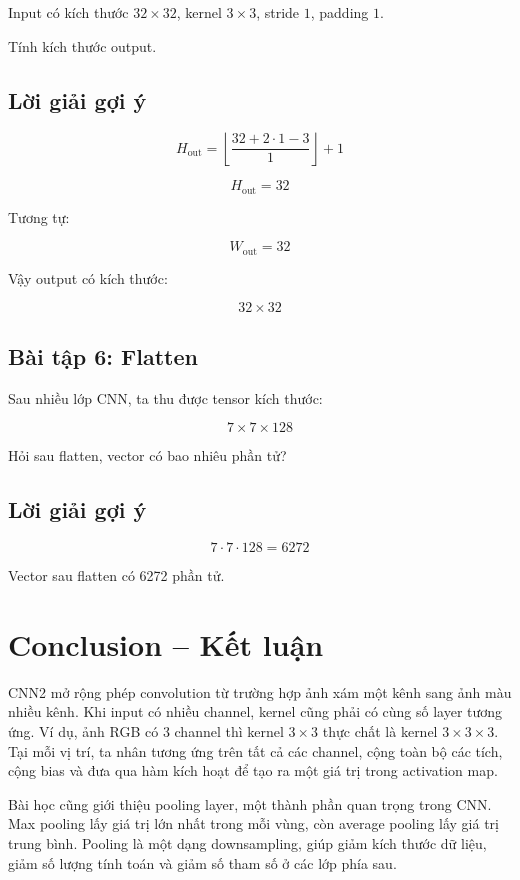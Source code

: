 Input có kích thước $32\times32$, kernel $3\times3$, stride $1$, padding $1$.

Tính kích thước output.

\subsection*{Lời giải gợi ý}

\[
    H_{\text{out}}
    =
    \left\lfloor
    \frac{32+2\cdot1-3}{1}
    \right\rfloor
    +1
\]

\[
    H_{\text{out}}
    =
    32
\]

Tương tự:

\[
    W_{\text{out}}=32
\]

Vậy output có kích thước:

\[
    32\times32
\]

\subsection*{Bài tập 6: Flatten}

Sau nhiều lớp CNN, ta thu được tensor kích thước:

\[
    7\times7\times128
\]

Hỏi sau flatten, vector có bao nhiêu phần tử?

\subsection*{Lời giải gợi ý}

\[
    7\cdot7\cdot128=6272
\]

Vector sau flatten có 6272 phần tử.

\section*{Conclusion -- Kết luận}

CNN2 mở rộng phép convolution từ trường hợp ảnh xám một kênh sang ảnh màu nhiều kênh. Khi input có nhiều channel, kernel cũng phải có cùng số layer tương ứng. Ví dụ, ảnh RGB có 3 channel thì kernel $3\times3$ thực chất là kernel $3\times3\times3$. Tại mỗi vị trí, ta nhân tương ứng trên tất cả các channel, cộng toàn bộ các tích, cộng bias và đưa qua hàm kích hoạt để tạo ra một giá trị trong activation map.

Bài học cũng giới thiệu pooling layer, một thành phần quan trọng trong CNN. Max pooling lấy giá trị lớn nhất trong mỗi vùng, còn average pooling lấy giá trị trung bình. Pooling là một dạng downsampling, giúp giảm kích thước dữ liệu, giảm số lượng tính toán và giảm số tham số ở các lớp phía sau.

